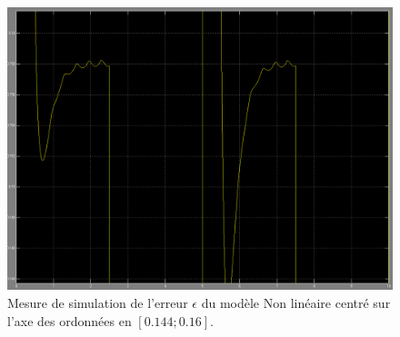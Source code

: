 \begin{figure}[!ht]
\centering
\includegraphics[width = .9\textwidth]{./annexes/annexe3/NL_erreur-Consigne_Vs_RE_zoom.png}
\caption[Mesure de simulation de l'erreur entre la référence et la sortie $V_s$ du modèle Non linéaire zoomé]{Mesure de simulation de l'erreur $\epsilon$ du modèle Non linéaire centré sur l'axe des ordonnées en $[0.144; 0.16].$\label{fig:SIMULINK_NL_erreur_reponse_zoom}}	
\end{figure}


